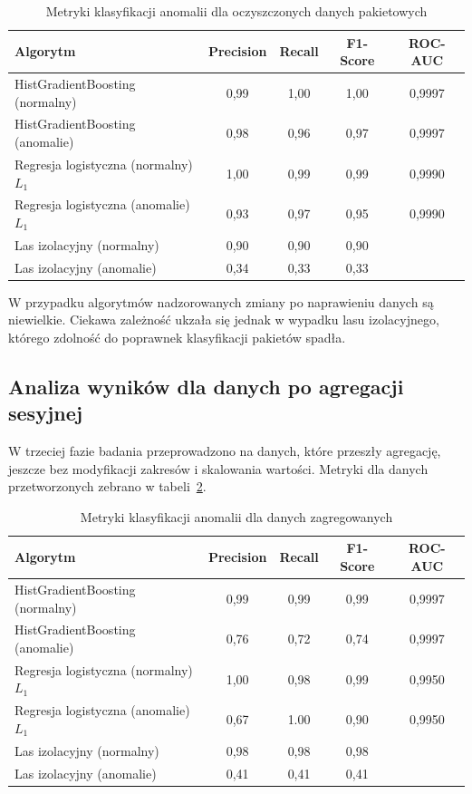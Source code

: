 \documentclass[12pt,twoside]{article}
\begin{document}
\begin{table}[ht]
\caption{Metryki klasyfikacji anomalii dla oczyszczonych danych pakietowych}
\centering		
	\begin{tabular}{|l|c|c|c|c|}	
		\hline
		Algorytm & Precision & Recall & F1-Score & ROC-AUC \\
		\hline
		HistGradientBoosting (normalny) & 0,99 & 1,00 & 1,00 & 0,9997 \\
		HistGradientBoosting (anomalie) & 0,98 & 0,96 & 0,97 & 0,9997 \\
		Regresja logistyczna (normalny) $L_1$ & 1,00 & 0,99 & 0,99 & 0,9990 \\
		Regresja logistyczna (anomalie) $L_1$ & 0,93 & 0,97 & 0,95 & 0,9990 \\
		Las izolacyjny (normalny) & 0,90 & 0,90 & 0,90 &  \\
		Las izolacyjny (anomalie) & 0,34 & 0,33 & 0,33 & \\
		\hline
	\end{tabular}	
\label{Tab:Wyniki2}
\end{table}

W przypadku algorytmów nadzorowanych zmiany po naprawieniu danych są niewielkie.
Ciekawa zależność ukzała się jednak w wypadku lasu izolacyjnego, którego zdolność do poprawnek klasyfikacji pakietów spadła.

\subsection{Analiza wyników dla danych po agregacji sesyjnej}

W trzeciej fazie badania przeprowadzono na danych, które przeszły agregację, jeszcze bez modyfikacji zakresów i skalowania wartości. 
Metryki dla danych przetworzonych zebrano w tabeli~\ref{Tab:Wyniki3}.

\begin{table}[ht]
\caption{Metryki klasyfikacji anomalii dla danych zagregowanych}
\centering		
	\begin{tabular}{|l|c|c|c|c|}	
		\hline
		Algorytm & Precision & Recall & F1-Score & ROC-AUC \\
		\hline
		HistGradientBoosting (normalny) & 0,99 & 0,99 & 0,99 & 0,9997 \\
		HistGradientBoosting (anomalie) & 0,76 & 0,72 & 0,74 & 0,9997 \\
		Regresja logistyczna (normalny) $L_1$ & 1,00 & 0,98 & 0,99 & 0,9950 \\
		Regresja logistyczna (anomalie) $L_1$ & 0,67 & 1.00 & 0,90 & 0,9950 \\
		Las izolacyjny (normalny) & 0,98 & 0,98 & 0,98 &  \\
		Las izolacyjny (anomalie) & 0,41 & 0,41 & 0,41 & \\
		\hline
	\end{tabular}	
\label{Tab:Wyniki3}
\end{table}
\end{document}
